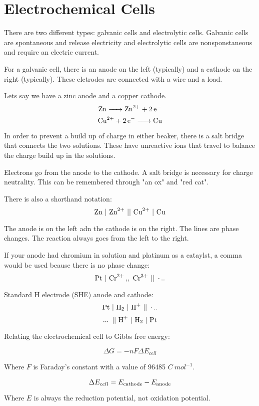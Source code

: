 \documentclass{article}
\begin{document}
\section{Electrochemical Cells}

There are two different types: galvanic cells and electrolytic cells. Galvanic
cells are spontaneous and release electricity and electrolytic cells are
nonsponstaneous and require an electric current.

For a galvanic cell, there is an anode on the left (typically) and a cathode on
the right (typically). These elctrodes are connected with a wire and a load.

Lets say we have a zinc anode and a copper cathode.
$$\ce{Zn -> Zn^{2+} + 2e-}$$
$$\ce{Cu^{2+} + 2e- -> Cu}$$

In order to prevent a build up of charge in either beaker, there is a salt
bridge that connects the two solutions. These have unreactive ions that travel
to balance the charge build up in the solutions.

Electrons go from the anode to the cathode. A salt bridge is necessary for
charge neutrality. This can be remembered through "an ox" and "red cat".

There is also a shorthand notation:
$$\ce{Zn\ \vert\ Zn^{2+}\ \vert\vert\ Cu^{2+}\ \vert\ Cu}$$

The anode is on the left adn the cathode is on the right. The lines are phase
changes. The reaction always goes from the left to the right.

If your anode had chromium in solution and platinum as a cataylst, a comma would
be used beause there is no phase change:
$$\ce{Pt\ \vert\ Cr^{2+} ,,\ Cr^{3+}\ \vert\vert\ ...}$$

Standard H electrode (SHE) anode and cathode:
$$\ce{Pt\ \vert\ H_2\ \vert\ H+\ \vert\vert\ ...}$$
$$\ce{...\ \vert\vert\ H+\ \vert\ H_2\ \vert\ Pt}$$

Relating the electrochemical cell to Gibbs free energy:

$$\Delta G = -n F \Delta E_{cell}$$

Where $F$ is Faraday's constant with a value of 96485 $\si{C\ mol^{-1}}$.

$$\Delta E_{cell} = E_{\rm{cathode}} - E_{\rm{anode}}$$

Where $E$ is always the reduction potential, not oxidation potential.
\end{document}

